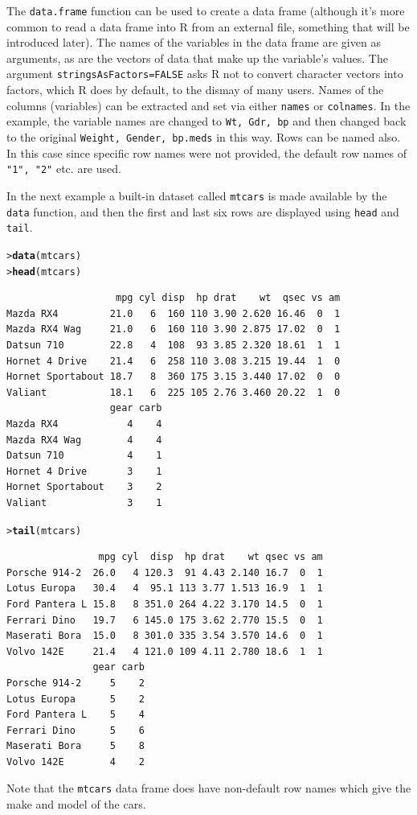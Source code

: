 \documentclass[12pt,oneside]{book}\usepackage[]{graphicx}\usepackage[]{color}
\makeatletter
\newcommand{\hlstd}[1]{\textcolor[rgb]{0.345,0.345,0.345}{#1}}%
\newcommand{\hlkwd}[1]{\textcolor[rgb]{0.737,0.353,0.396}{\textbf{#1}}}%
\newenvironment{kframe}{%
 \def\at@end@of@kframe{}%
 \ifinner\ifhmode%
  \def\at@end@of@kframe{\end{minipage}}%
  \begin{minipage}{\columnwidth}%
 \fi\fi%
 \def\FrameCommand##1{\hskip\@totalleftmargin \hskip-\fboxsep
 \colorbox{shadecolor}{##1}\hskip-\fboxsep
     \hskip-\linewidth \hskip-\@totalleftmargin \hskip\columnwidth}%
 \MakeFramed {\advance\hsize-\width
   \@totalleftmargin\z@ \linewidth\hsize
   \@setminipage}}%
 {\par\unskip\endMakeFramed%
 \at@end@of@kframe}
\newenvironment{knitrout}{}{} %
\makeatother
\begin{document}
The \verb+data.frame+ function can be used to create a data frame (although it's more common to read a data frame into R from an external file, something that will be introduced later). The names of the variables in the data frame are given as arguments, as are the vectors of data that make up the variable's values. The argument \verb+stringsAsFactors=FALSE+ asks R not to convert character vectors into factors, which R does by default, to the dismay of many users. Names of the columns (variables) can be extracted and set via either \verb+names+ or \verb+colnames+. In the example, the variable names are changed to \verb+Wt, Gdr, bp+ and then changed back to the original \verb+Weight, Gender, bp.meds+ in this way. Rows can be named also. In this case since specific row names were not provided, the default row names of \verb+"1", "2"+ etc. are used.

In the next example a built-in dataset called \verb+mtcars+ is made available by the \verb+data+ function, and then the first  and last six rows are displayed using \verb+head+ and \verb+tail+.
\begin{knitrout}
\color{fgcolor}\begin{kframe}
\begin{alltt}
\hlstd{> }\hlkwd{data}\hlstd{(mtcars)}
\hlstd{> }\hlkwd{head}\hlstd{(mtcars)}
\end{alltt}
\begin{verbatim}
                   mpg cyl disp  hp drat    wt  qsec vs am
Mazda RX4         21.0   6  160 110 3.90 2.620 16.46  0  1
Mazda RX4 Wag     21.0   6  160 110 3.90 2.875 17.02  0  1
Datsun 710        22.8   4  108  93 3.85 2.320 18.61  1  1
Hornet 4 Drive    21.4   6  258 110 3.08 3.215 19.44  1  0
Hornet Sportabout 18.7   8  360 175 3.15 3.440 17.02  0  0
Valiant           18.1   6  225 105 2.76 3.460 20.22  1  0
                  gear carb
Mazda RX4            4    4
Mazda RX4 Wag        4    4
Datsun 710           4    1
Hornet 4 Drive       3    1
Hornet Sportabout    3    2
Valiant              3    1
\end{verbatim}
\begin{alltt}
\hlstd{> }\hlkwd{tail}\hlstd{(mtcars)}
\end{alltt}
\begin{verbatim}
                mpg cyl  disp  hp drat    wt qsec vs am
Porsche 914-2  26.0   4 120.3  91 4.43 2.140 16.7  0  1
Lotus Europa   30.4   4  95.1 113 3.77 1.513 16.9  1  1
Ford Pantera L 15.8   8 351.0 264 4.22 3.170 14.5  0  1
Ferrari Dino   19.7   6 145.0 175 3.62 2.770 15.5  0  1
Maserati Bora  15.0   8 301.0 335 3.54 3.570 14.6  0  1
Volvo 142E     21.4   4 121.0 109 4.11 2.780 18.6  1  1
               gear carb
Porsche 914-2     5    2
Lotus Europa      5    2
Ford Pantera L    5    4
Ferrari Dino      5    6
Maserati Bora     5    8
Volvo 142E        4    2
\end{verbatim}
\end{kframe}
\end{knitrout}
Note that the \verb+mtcars+ data frame does have non-default row names which give the make and model of the cars.
\end{document}

